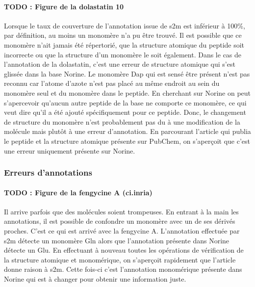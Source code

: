 \documentclass[12pt,french,twoside]{report}
\begin{document}
\label{dolastatin_p}

\paragraph{TODO : Figure de la dolastatin 10}

\paragraph{}Lorsque le taux de couverture de l'annotation issue de s2m est inférieur à 100\%, par définition, au moins un monomère n'a pu être trouvé.
Il est possible que ce monomère n'ait jamais été répertorié, que la structure atomique du peptide soit incorrecte ou que la structure d'un monomère le soit également.
Dans le cas de l'annotation de la dolastatin, c'est une erreur de structure atomique qui s'est glissée dans la base Norine.
Le monomère Dap qui est sensé être présent n'est pas reconnu car l'atome d'azote n'est pas placé au même endroit au sein du monomère seul et du monomère dans le peptide.
En cherchant sur Norine on peut s'apercevoir qu'aucun autre peptide de la base ne comporte ce monomère, ce qui veut dire qu'il a été ajouté spécifiquement pour ce peptide.
Donc, le changement de structure du monomère n'est probablement pas du à une modification de la molécule mais plutôt à une erreur d'annotation.
En parcourant l'article qui publia le peptide et la structure atomique présente sur PubChem, on s'aperçoit que c'est une erreur uniquement présente sur Norine.


\subsubsection{Erreurs d'annotations}

\paragraph{TODO : Figure de la fengycine A (ci.inria)}

\paragraph{}Il arrive parfois que des molécules soient trompeuses.
En entrant à la main les annotations, il est possible de confondre un monomère avec un de ses dérivés proches.
C'est ce qui est arrivé avec la fengycine A.
L'annotation effectuée par s2m détecte un monomère Gln alors que l'annotation présente dans Norine détecte un Glu.
En effectuant à nouveau toutes les opérations de vérification de la structure atomique et monomérique, on s'aperçoit rapidement que l'article donne raison à s2m.
Cette fois-ci c'est l'annotation monomérique présente dans Norine qui est à changer pour obtenir une information juste.
\end{document}
